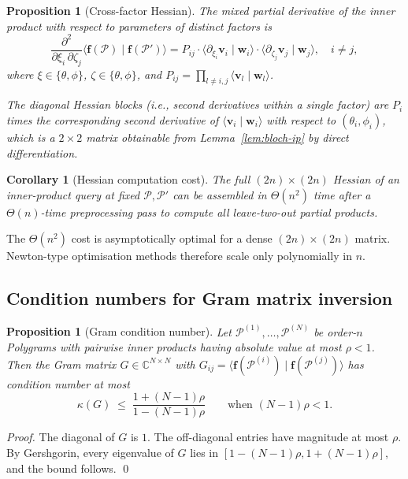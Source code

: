 \documentclass[11pt,letterpaper]{article}
\newtheorem{proposition}[theorem]{Proposition}
\newtheorem{corollary}[theorem]{Corollary}
\theoremstyle{definition}
\newcommand{\C}{\mathbb{C}}
\newcommand{\Polygram}{\mathcal{P}}
\newcommand{\inner}[2]{\langle #1 \mid #2 \rangle}
\begin{document}
\begin{proposition}[Cross-factor Hessian]
\label{prop:hessian}
The mixed partial derivative of the inner product with respect to
parameters of distinct factors is
\[
\frac{\partial^{2}}{\partial \xi_{i}\,\partial \zeta_{j}}
\inner{\bm{f}(\Polygram)}{\bm{f}(\Polygram')}
   = P_{ij}\cdot \inner{\partial_{\xi_{i}}\bm{v}_{i}}{\bm{w}_{i}}
   \cdot \inner{\partial_{\zeta_{j}}\bm{v}_{j}}{\bm{w}_{j}},
\quad i \neq j,
\]
where $\xi \in \{\theta,\phi\}$, $\zeta \in \{\theta,\phi\}$, and
$P_{ij} = \prod_{l \neq i,j} \inner{\bm{v}_{l}}{\bm{w}_{l}}$.

The diagonal Hessian blocks (i.e., second derivatives within a single factor)
are $P_{i}$ times the corresponding second derivative of $\inner{\bm{v}_{i}}{
\bm{w}_{i}}$ with respect to $(\theta_{i}, \phi_{i})$, which is a $2 \times 2$
matrix obtainable from Lemma~\ref{lem:bloch-ip} by direct differentiation.
\end{proposition}

\begin{corollary}[Hessian computation cost]
\label{cor:hessian-cost}
The full $(2n) \times (2n)$ Hessian of an inner-product query at fixed
$\Polygram, \Polygram'$ can be assembled in $\Theta(n^{2})$ time after a
$\Theta(n)$-time preprocessing pass to compute all leave-two-out partial
products.
\end{corollary}

The $\Theta(n^{2})$ cost is asymptotically optimal for a dense $(2n) \times
(2n)$ matrix. Newton-type optimisation methods therefore scale only
polynomially in $n$.

\subsection{Condition numbers for Gram matrix inversion}

\begin{proposition}[Gram condition number]
\label{prop:gram-cond}
Let $\Polygram^{(1)}, \dots, \Polygram^{(N)}$ be order-$n$ Polygrams with
pairwise inner products having absolute value at most $\rho < 1$. Then the
Gram matrix $G \in \C^{N \times N}$ with $G_{ij} = \inner{\bm{f}(\Polygram^{(i)})}{
\bm{f}(\Polygram^{(j)})}$ has condition number at most
\[
\kappa(G) \;\leq\; \frac{1 + (N-1)\rho}{1 - (N-1)\rho}
\qquad \text{when } (N-1)\rho < 1.
\]
\end{proposition}
\begin{proof}
The diagonal of $G$ is $1$. The off-diagonal entries have magnitude at most
$\rho$. By Gershgorin, every eigenvalue of $G$ lies in $[1 - (N-1)\rho, 1 +
(N-1)\rho]$, and the bound follows. \qed
\end{proof}
\end{document}
